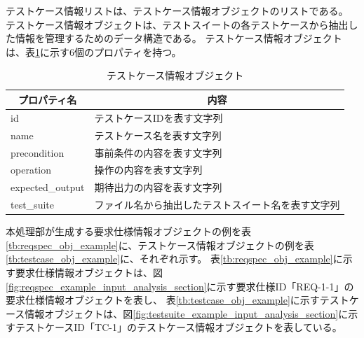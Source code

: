 テストケース情報リストは、テストケース情報オブジェクトのリストである。
テストケース情報オブジェクトは、テストスイートの各テストケースから抽出した情報を管理するためのデータ構造である。
テストケース情報オブジェクトは、表\ref{tb:testcase_obj}に示す6個のプロパティを持つ。

\begin{table}[tp]
    \caption{テストケース情報オブジェクト}\label{tb:testcase_obj}
    \centering
    \begin{tabular}{l|l}
        \multicolumn{1}{c|}{プロパティ名} & \multicolumn{1}{c}{内容} \\
        \hline
        \hline
        id & テストケースIDを表す文字列 \\
        \hline
        name & テストケース名を表す文字列 \\
        \hline
        precondition & 事前条件の内容を表す文字列 \\
        \hline
        operation & 操作の内容を表す文字列 \\
        \hline
        expected\_output & 期待出力の内容を表す文字列 \\
        \hline
        test\_suite & ファイル名から抽出したテストスイート名を表す文字列 \\
        \hline
    \end{tabular}
\end{table}

本処理部が生成する要求仕様情報オブジェクトの例を表\ref{tb:reqspec_obj_example}に、テストケース情報オブジェクトの例を表\ref{tb:testcase_obj_example}に、それぞれ示す。
表\ref{tb:reqspec_obj_example}に示す要求仕様情報オブジェクトは、図\ref{fig:reqspec_example_input_analysis_section}に示す要求仕様ID「REQ-1-1」の要求仕様情報オブジェクトを表し、
表\ref{tb:testcase_obj_example}に示すテストケース情報オブジェクトは、図\ref{fig:testsuite_example_input_analysis_section}に示すテストケースID「TC-1」のテストケース情報オブジェクトを表している。

